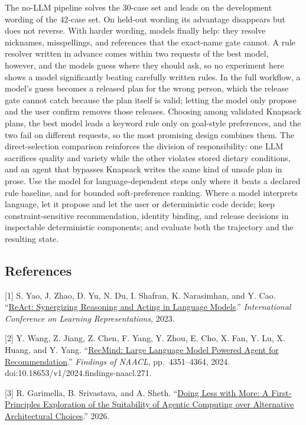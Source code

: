 \documentclass[
  10pt,
  letterpaper,
]{article}
\begin{document}
The no-LLM pipeline solves the 30-case set and leads on the development
wording of the 42-case set. On held-out wording its advantage disappears
but does not reverse. With harder wording, models finally help: they
resolve nicknames, misspellings, and references that the exact-name gate
cannot. A rule resolver written in advance comes within two requests of
the best model, however, and the models guess where they should ask, so
no experiment here shows a model significantly beating carefully written
rules. In the full workflow, a model's guess becomes a released plan for
the wrong person, which the release gate cannot catch because the plan
itself is valid; letting the model only propose and the user confirm
removes those releases. Choosing among validated Knapsack plans, the
best model leads a keyword rule only on goal-style preferences, and the
two fail on different requests, so the most promising design combines
them. The direct-selection comparison reinforces the division of
responsibility: one LLM sacrifices quality and variety while the other
violates stored dietary conditions, and an agent that bypasses Knapsack
writes the same kind of unsafe plan in prose. Use the model for
language-dependent steps only where it beats a declared rule baseline,
and for bounded soft-preference ranking. Where a model interprets
language, let it propose and let the user or deterministic code decide;
keep constraint-sensitive recommendation, identity binding, and release
decisions in inspectable deterministic components; and evaluate both the
trajectory and the resulting state.

\subsection{References}\label{references}

{[}1{]} S. Yao, J. Zhao, D. Yu, N. Du, I. Shafran, K. Narasimhan, and Y.
Cao. ``\href{https://openreview.net/forum?id=WE_vluYUL-X}{ReAct:
Synergizing Reasoning and Acting in Language Models}.''
\emph{International Conference on Learning Representations}, 2023.

{[}2{]} Y. Wang, Z. Jiang, Z. Chen, F. Yang, Y. Zhou, E. Cho, X. Fan, Y.
Lu, X. Huang, and Y. Yang.
``\href{https://aclanthology.org/2024.findings-naacl.271/}{RecMind:
Large Language Model Powered Agent for Recommendation}.'' \emph{Findings
of NAACL}, pp.~4351--4364, 2024.
doi:10.18653/v1/2024.findings-naacl.271.

{[}3{]} R. Garimella, B. Srivastava, and A. Sheth.
``\href{https://arxiv.org/abs/2610.23921}{Doing Less with More: A
First-Principles Exploration of the Suitability of Agentic Computing
over Alternative Architectural Choices}.'' 2026.
\end{document}
